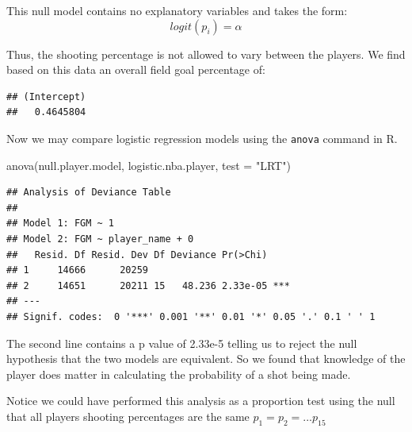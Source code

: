 \documentclass[
]{book}
\newenvironment{Shaded}{\begin{snugshade}}{\end{snugshade}}
\newcommand{\AttributeTok}[1]{\textcolor[rgb]{0.77,0.63,0.00}{#1}}
\newcommand{\FunctionTok}[1]{\textcolor[rgb]{0.00,0.00,0.00}{#1}}
\newcommand{\NormalTok}[1]{#1}
\newcommand{\SpecialCharTok}[1]{\textcolor[rgb]{0.00,0.00,0.00}{#1}}
\newcommand{\StringTok}[1]{\textcolor[rgb]{0.31,0.60,0.02}{#1}}
\theoremstyle{definition}
\theoremstyle{definition}
\theoremstyle{definition}
\theoremstyle{definition}
\theoremstyle{remark}
\begin{document}
This null model contains no explanatory variables and takes the form: \[logit(p_i)=\alpha\]

Thus, the shooting percentage is not allowed to vary between the players. We find based on this data an overall field goal percentage of:

\begin{Shaded}
\end{Shaded}

\begin{verbatim}
## (Intercept) 
##   0.4645804
\end{verbatim}

Now we may compare logistic regression models using the \texttt{anova} command in R.

\begin{Shaded}
\begin{Highlighting}[]
\FunctionTok{anova}\NormalTok{(null.player.model, logistic.nba.player, }\AttributeTok{test =} \StringTok{"LRT"}\NormalTok{)}
\end{Highlighting}
\end{Shaded}

\begin{verbatim}
## Analysis of Deviance Table
## 
## Model 1: FGM ~ 1
## Model 2: FGM ~ player_name + 0
##   Resid. Df Resid. Dev Df Deviance Pr(>Chi)    
## 1     14666      20259                         
## 2     14651      20211 15   48.236 2.33e-05 ***
## ---
## Signif. codes:  0 '***' 0.001 '**' 0.01 '*' 0.05 '.' 0.1 ' ' 1
\end{verbatim}

The second line contains a p value of 2.33e-5 telling us to reject the null hypothesis that the two models are equivalent. So we found that knowledge of the player does matter in calculating the probability of a shot being made.

Notice we could have performed this analysis as a proportion test using the null that all players shooting percentages are the same \(p_1=p_2=...p_{15}\)

\begin{Shaded}
\end{Shaded}
\end{document}
